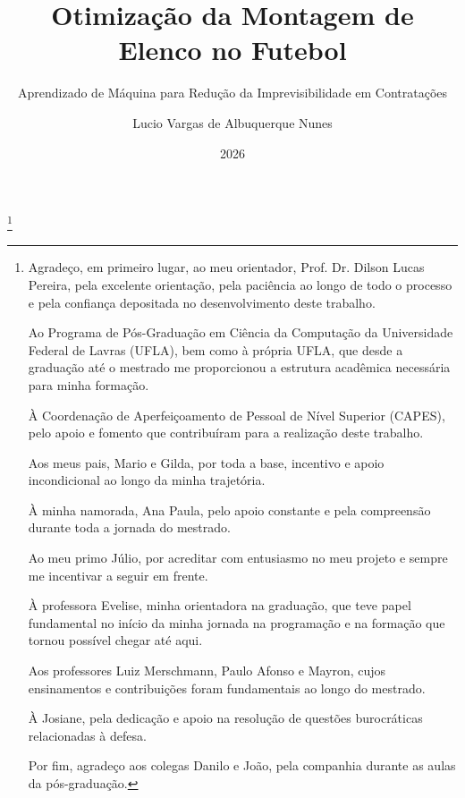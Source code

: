 \documentclass{templufla}
\author{Lucio Vargas de Albuquerque Nunes}
\title{Otimização da Montagem de Elenco no Futebol}
\subtitle{Aprendizado de Máquina para Redução da Imprevisibilidade em Contratações}
\date{2026}
\begin{document}

\maketitle


\thanks{\hspace*{\parindent}Agradeço, em primeiro lugar, ao meu orientador, Prof. Dr. Dilson Lucas Pereira, pela excelente orientação, pela paciência ao longo de todo o processo e pela confiança depositada no desenvolvimento deste trabalho.

Ao Programa de Pós-Graduação em Ciência da Computação da Universidade Federal de Lavras (UFLA), bem como à própria UFLA, que desde a graduação 
até o mestrado me proporcionou a estrutura acadêmica necessária para minha formação.

À Coordenação de Aperfeiçoamento de Pessoal de Nível Superior (CAPES), pelo apoio e fomento que contribuíram para a realização deste trabalho.

Aos meus pais, Mario e Gilda, por toda a base, incentivo e apoio incondicional ao longo da minha trajetória.

À minha namorada, Ana Paula, pelo apoio constante e pela compreensão durante toda a jornada do mestrado.

Ao meu primo Júlio, por acreditar com entusiasmo no meu projeto e sempre me incentivar a seguir em frente.

À professora Evelise, minha orientadora na graduação, que teve papel fundamental no início da minha jornada na programação e na formação que tornou possível chegar até aqui.

Aos professores Luiz Merschmann, Paulo Afonso e Mayron, cujos ensinamentos e contribuições foram fundamentais ao longo do mestrado.

À Josiane, pela dedicação e apoio na resolução de questões burocráticas relacionadas à defesa.

Por fim, agradeço aos colegas Danilo e João, pela companhia durante as aulas da pós-graduação.}         

\end{document}
